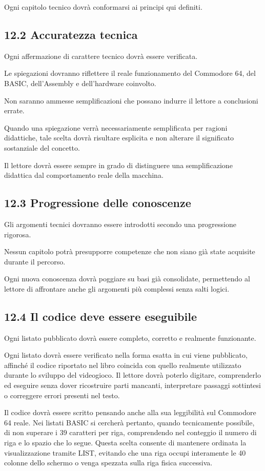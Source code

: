 \documentclass{article}
\begin{document}
Ogni capitolo tecnico dovrà conformarsi ai principi qui definiti.

\subsection{12.2 Accuratezza tecnica}
Ogni affermazione di carattere tecnico dovrà essere verificata.

Le spiegazioni dovranno riflettere il reale funzionamento del Commodore 64, del BASIC, dell'Assembly e dell'hardware
coinvolto.

Non saranno ammesse semplificazioni che possano indurre il lettore a conclusioni errate.

Quando una spiegazione verrà necessariamente semplificata per ragioni didattiche, tale scelta dovrà risultare esplicita
e non alterare il significato sostanziale del concetto.

Il lettore dovrà essere sempre in grado di distinguere una semplificazione didattica dal comportamento reale della
macchina.

\subsection{12.3 Progressione delle conoscenze}
Gli argomenti tecnici dovranno essere introdotti secondo una progressione rigorosa.

Nessun capitolo potrà presupporre competenze che non siano già state acquisite durante il percorso.

Ogni nuova conoscenza dovrà poggiare su basi già consolidate, permettendo al lettore di affrontare anche gli argomenti
più complessi senza salti logici.

\subsection{12.4 Il codice deve essere eseguibile}
Ogni listato pubblicato dovrà essere completo, corretto e realmente funzionante.

Ogni listato dovrà essere verificato nella forma esatta in cui viene pubblicato, affinché il codice riportato nel libro
coincida con quello realmente utilizzato durante lo sviluppo del videogioco. Il lettore dovrà poterlo digitare,
comprenderlo ed eseguire senza dover ricostruire parti mancanti, interpretare passaggi sottintesi o correggere errori
presenti nel testo.

Il codice dovrà essere scritto pensando anche alla sua leggibilità sul Commodore 64 reale. Nei listati BASIC si cercherà
pertanto, quando tecnicamente possibile, di non superare i 39 caratteri per riga, comprendendo nel conteggio il numero
di riga e lo spazio che lo segue. Questa scelta consente di mantenere ordinata la visualizzazione tramite LIST,
evitando che una riga occupi interamente le 40 colonne dello schermo o venga spezzata sulla riga fisica successiva.
\end{document}
